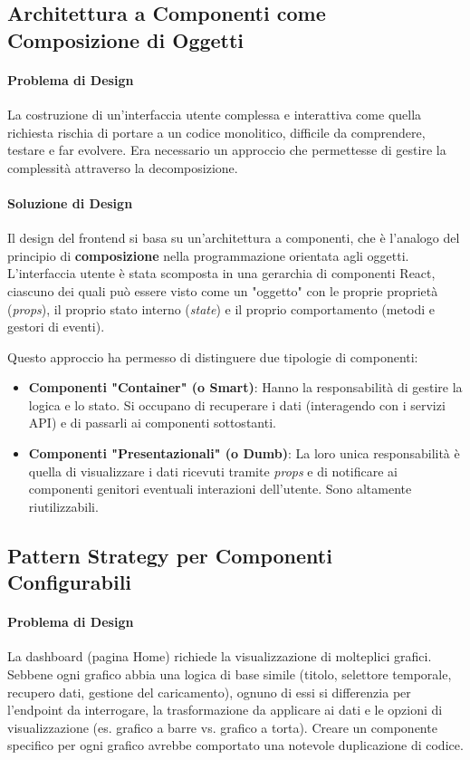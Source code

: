 \documentclass[12pt,a4paper,openright,twoside]{book}
\begin{document}
\subsection{Architettura a Componenti come Composizione di Oggetti}
\label{subsec:design_component_composition}

\paragraph{Problema di Design}
La costruzione di un'interfaccia utente complessa e interattiva come quella richiesta rischia di portare a un codice monolitico, difficile da comprendere, testare e far evolvere. Era necessario un approccio che permettesse di gestire la complessità attraverso la decomposizione.

\paragraph{Soluzione di Design}
Il design del frontend si basa su un'architettura a componenti, che è l'analogo del principio di \textbf{composizione} nella programmazione orientata agli oggetti. L'interfaccia utente è stata scomposta in una gerarchia di componenti React, ciascuno dei quali può essere visto come un "oggetto" con le proprie proprietà (\textit{props}), il proprio stato interno (\textit{state}) e il proprio comportamento (metodi e gestori di eventi).

Questo approccio ha permesso di distinguere due tipologie di componenti:
\begin{itemize}
    \item \textbf{Componenti "Container" (o Smart)}: Hanno la responsabilità di gestire la logica e lo stato. Si occupano di recuperare i dati (interagendo con i servizi API) e di passarli ai componenti sottostanti.
    \item \textbf{Componenti "Presentazionali" (o Dumb)}: La loro unica responsabilità è quella di visualizzare i dati ricevuti tramite \textit{props} e di notificare ai componenti genitori eventuali interazioni dell'utente. Sono altamente riutilizzabili.
\end{itemize}

\subsection{Pattern Strategy per Componenti Configurabili}
\label{subsec:design_strategy_frontend}

\paragraph{Problema di Design}
La dashboard (pagina Home) richiede la visualizzazione di molteplici grafici. Sebbene ogni grafico abbia una logica di base simile (titolo, selettore temporale, recupero dati, gestione del caricamento), ognuno di essi si differenzia per l'endpoint da interrogare, la trasformazione da applicare ai dati e le opzioni di visualizzazione (es. grafico a barre vs. grafico a torta). Creare un componente specifico per ogni grafico avrebbe comportato una notevole duplicazione di codice.
\end{document}
